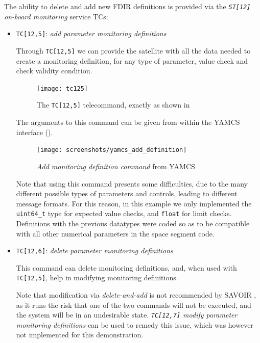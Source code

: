 \documentclass[a4paper,nobib,final]{tufte-book}
\begin{document}
	The ability to delete and add new \acs{FDIR} definitions is provided via the \emph{\texttt{ST[12]} on-board monitoring} service \acsp{TC}:
	
	\begin{itemize}
	\item \texttt{TC[12,5]}: \emph{add parameter monitoring definitions}
	
	Through \texttt{TC[12,5]} we can provide the satellite with all the data needed to create a monitoring definition, for any type of parameter, value check and check validity condition.
	
	\begin{figure}[h]
		\texttt{[image: tc125]}
		\caption{The \texttt{TC[12,5]} telecommand, exactly as shown in \autocite{ECSS-E-ST-70-41C}}
	\end{figure}
	
	The arguments to this command can be given from within the \acs{YAMCS} interface ().
	
	\begin{figure}[h]
		\centering
		\texttt{[image: screenshots/yamcs\_add\_definition]}
		\caption{\emph{Add monitoring definition command} from \acs{YAMCS}}
		\label{fig:yamcs_add_definition}
	\end{figure}
	
	Note that using this command presents some difficulties, due to the many different possible types of parameters and controls, leading to different message formats. For this reason, in this example we only implemented the \texttt{uint64_t} type for expected value checks, and \texttt{float} for limit checks. Definitions with the previous datatypes were coded so as to be compatible with all other numerical parameters in the space segment code.
	
	\pagebreak[4]
	\item \texttt{TC[12,6]}: \emph{delete parameter monitoring definitions}
		
		This command can delete monitoring definitions, and, when used with \texttt{TC[12,5]}, help in modifying monitoring definitions.
		
		Note that modification via \emph{delete-and-add} is not recommended by \acs{SAVOIR} \autocite{SAVOIR-HB-003}, as it runs the risk that one of the two commands will not be executed, and the system will be in an undesirable state. \emph{\texttt{TC[12,7]} modify parameter monitoring definitions} can be used to remedy this issue, which was however not implemented for this demonstration.
		
	\end{itemize}
	
\end{document}
